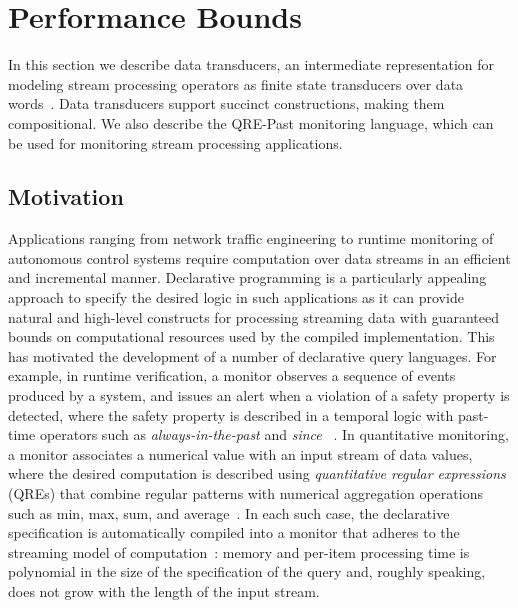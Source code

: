 \section{Performance Bounds}
\label{sec:monitoring}

In this section we describe data transducers,
an intermediate representation for modeling
stream processing operators as finite state transducers
over data words~.
Data transducers support succinct constructions, making them
compositional.
We also describe the QRE-Past monitoring language, which
can be used for monitoring stream processing applications.

\subsection{Motivation}

Applications ranging from network traffic engineering to runtime monitoring of autonomous control systems
require computation over data streams in an efficient and incremental manner.
Declarative programming is a particularly appealing approach to specify the desired logic in such
applications as it can provide natural and high-level constructs for processing streaming data
with guaranteed bounds on computational resources used by the compiled implementation.
This has motivated the development of a number of declarative query languages.
For example, in runtime verification, a monitor observes a sequence of events produced by
a system, and issues an alert when a violation of a safety property is detected, where the safety property
is described in a temporal logic with past-time operators such as \emph{always-in-the-past} and \emph{since}
~\cite{manna2012temporal,havelund2004efficient}.
In quantitative monitoring, a monitor associates a numerical value with an input stream of data values,
where the desired computation is described using \emph{quantitative regular expressions} (QREs) that combine
regular patterns with numerical aggregation operations such as min, max, sum, and average~\cite{AFR2016QRE,MRAIK2017SQRE,YLMMAL2017NQRE}.
In each such case, the declarative specification is automatically compiled into a monitor that
adheres to the streaming model of computation~\cite{M2005DS}: memory and per-item
processing time is polynomial in the size of the specification of the query and, roughly speaking,
does not grow with the length of the input stream.


